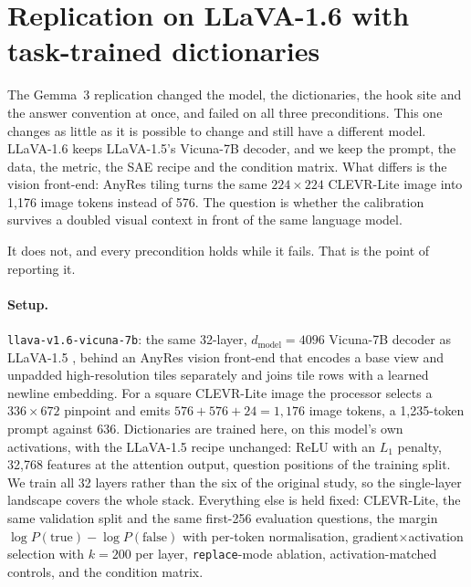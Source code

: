 \documentclass[11pt,a4paper]{article}
\begin{document}
  \newcommand{\llavasixstandalone}{}
\fi

\section{Replication on LLaVA-1.6 with task-trained dictionaries}
\label{sec:llava16}

The Gemma~3 replication changed the model, the dictionaries, the hook site and
the answer convention at once, and failed on all three preconditions. This one
changes as little as it is possible to change and still have a different model.
LLaVA-1.6 \citep{llavanext} keeps LLaVA-1.5's Vicuna-7B decoder, and we keep the
prompt, the data, the metric, the SAE recipe and the condition matrix. What
differs is the vision front-end: AnyRes tiling turns the same $224\times224$
CLEVR-Lite image into 1{,}176 image tokens instead of 576. The question is
whether the calibration survives a doubled visual context in front of the same
language model.

It does not, and every precondition holds while it fails. That is the point of
reporting it.

\paragraph{Setup.} \texttt{llava-v1.6-vicuna-7b}: the same 32-layer,
$d_{\text{model}} = 4096$ Vicuna-7B decoder as LLaVA-1.5 \citep{llava15}, behind
an AnyRes vision front-end that encodes a base view and unpadded high-resolution
tiles separately and joins tile rows with a learned newline embedding. For a
square CLEVR-Lite image the processor selects a $336\times672$ pinpoint and
emits $576 + 576 + 24 = 1{,}176$ image tokens, a 1{,}235-token prompt against
636. Dictionaries are trained here, on this model's own activations, with the
LLaVA-1.5 recipe unchanged: ReLU with an $L_1$ penalty, 32{,}768 features at the
attention output, question positions of the training split. We train all 32
layers rather than the six of the original study, so the single-layer landscape
covers the whole stack. Everything else is held fixed: CLEVR-Lite, the same
validation split and the same first-256 evaluation questions, the margin
$\log P(\text{true}) - \log P(\text{false})$ with per-token normalisation,
gradient$\times$activation selection with $k = 200$ per layer,
\texttt{replace}-mode ablation, activation-matched controls, and the condition
matrix.
\end{document}
